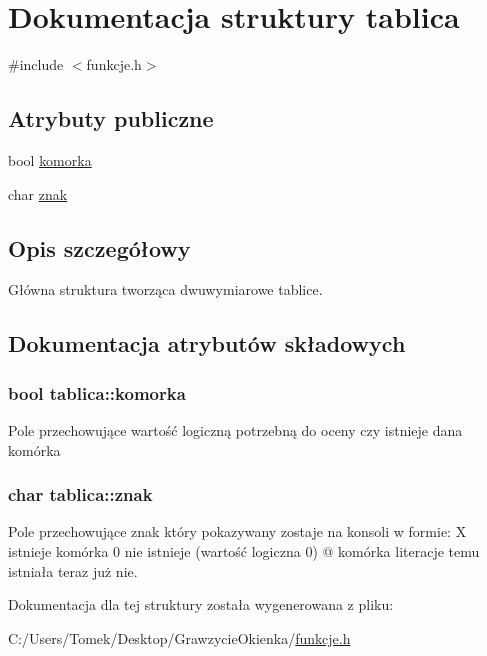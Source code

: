 \hypertarget{structtablica}{}\section{Dokumentacja struktury tablica}
\label{structtablica}


{\ttfamily \#include $<$funkcje.\+h$>$}

\subsection*{Atrybuty publiczne}
\begin{DoxyCompactItemize}
\item 
bool \hyperlink{structtablica_a2c56032eb6d62daacf94d311a07e5132}{komorka}
\item 
char \hyperlink{structtablica_ae4036c42abf3053fd611290ff8dff313}{znak}
\end{DoxyCompactItemize}


\subsection{Opis szczegółowy}
Główna struktura tworząca dwuwymiarowe tablice. 

\subsection{Dokumentacja atrybutów składowych}
\hypertarget{structtablica_a2c56032eb6d62daacf94d311a07e5132}{}
\subsubsection[{komorka}]{\setlength{\rightskip}{0pt plus 5cm}bool tablica\+::komorka}\label{structtablica_a2c56032eb6d62daacf94d311a07e5132}
Pole przechowujące wartość logiczną potrzebną do oceny czy istnieje dana komórka \hypertarget{structtablica_ae4036c42abf3053fd611290ff8dff313}{}
\subsubsection[{znak}]{\setlength{\rightskip}{0pt plus 5cm}char tablica\+::znak}\label{structtablica_ae4036c42abf3053fd611290ff8dff313}
Pole przechowujące znak który pokazywany zostaje na konsoli w formie\+: X istnieje komórka 0 nie istnieje (wartość logiczna 0) @ komórka literacje temu istniała teraz już nie. 

Dokumentacja dla tej struktury została wygenerowana z pliku\+:\begin{DoxyCompactItemize}
\item 
C\+:/\+Users/\+Tomek/\+Desktop/\+Grawzycie\+Okienka/\hyperlink{funkcje_8h}{funkcje.\+h}\end{DoxyCompactItemize}
